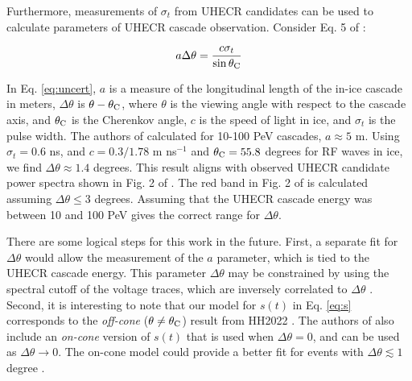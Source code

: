 \documentclass[amsmath,amssymb,aps,prd,10pt,twocolumn,showkeys]{revtex4}
\begin{document}
Furthermore, measurements of $\sigma_t$ from UHECR candidates can be used to calculate parameters of UHECR cascade observation.  Consider Eq. 5 of \cite{hansonnoyearcomplex-ae0}:

\begin{equation}
a\Delta\theta = \frac{c \sigma_t}{\sin\theta_{\rm C}} \label{eq:uncert}
\end{equation}

\noindent
In Eq. \ref{eq:uncert}, $a$ is a measure of the longitudinal length of the in-ice cascade in meters, $\Delta\theta$ is $\theta - \theta_{\rm C}$, where $\theta$ is the viewing angle with respect to the cascade axis, and $\theta_{\rm C}$ is the Cherenkov angle, $c$ is the speed of light in ice, and $\sigma_t$ is the pulse width.  The authors of \cite{PhysRevD.105.123019} calculated for 10-100 PeV cascades, $a \approx 5$ m.  Using $\sigma_t = 0.6$ ns, and $c = 0.3/1.78$ m ns$^{-1}$ and $\theta_{\rm C} = 55.8$ degrees for RF waves in ice, we find $\Delta\theta \approx 1.4$ degrees.  This result aligns with observed UHECR candidate power spectra shown in Fig. 2 of \cite{xwqy-yzrk}.  The red band in Fig. 2 of \cite{xwqy-yzrk} is calculated assuming $\Delta\theta \leq 3$ degrees.  Assuming that the UHECR cascade energy was between 10 and 100 PeV gives the correct range for $\Delta\theta$.

\newpage 

There are some logical steps for this work in the future. First, a separate fit for $\Delta\theta$ would allow the measurement of the $a$ parameter, which is tied to the UHECR cascade energy. This parameter $\Delta\theta$ may be constrained by using the spectral cutoff of the voltage traces, which are inversely correlated to $\Delta\theta$ \cite{10.1016/j.astropartphys.2017.03.008}.  Second, it is interesting to note that our model for $s(t)$ in Eq. \ref{eq:s} corresponds to the \textit{off-cone} ($\theta\neq \theta_{\rm C}$) result from HH2022 \cite{PhysRevD.105.123019}.  The authors of \cite{PhysRevD.105.123019} also include an \textit{on-cone} version of $s(t)$ that is used when $\Delta\theta = 0$, and can be used as $\Delta\theta\to 0$.  The on-cone model could provide a better fit for events with $\Delta\theta \lesssim 1$ degree \cite{PhysRevD.105.123019}.  
\end{document}
